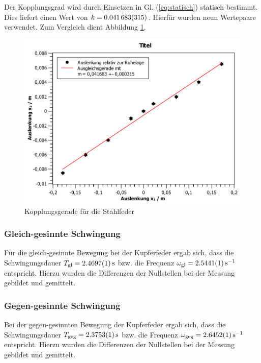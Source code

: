 \documentclass[11pt,a4paper,titlepage, ngerman]{article}
\newcommand{\refeq}[1]{Gl. (\ref{eq:#1})}
\begin{document}
				Der Kopplungsgrad wird durch Einsetzen in \refeq{statisch} statisch bestimmt. Dies liefert einen Wert von $k=\SI{0,041683 +- 0,000315}{}$. Hierfür wurden neun Wertepaare verwendet. Zum Vergleich dient Abbildung \ref{abb:FeKopp}.
				\begin{figure}[ht]
					\centering
					\includegraphics[width=\textwidth]{Kopplungsgerade-Fe.pdf}
					\caption{Kopplungsgerade für die Stahlfeder}
					\label{abb:FeKopp}	
				\end{figure}
			
			\subsubsection{Gleich-gesinnte Schwingung}
			
				Für die gleich-gesinnte Bewegung bei der Kupferfeder ergab sich, dass die Schwingungsdauer $T_\text{gl} = \SI{2,4697 +- 0,0001}{\second}$ bzw. die Frequenz $\omega_\text{gl}  = \SI{2,5441 +- 0,0001}{\s^{-1}}$ entspricht. Hierzu wurden die Differenzen der Nullstellen bei der Messung gebildet und gemittelt. 
			
			\subsubsection{Gegen-gesinnte Schwingung}
			
				Bei der gegen-gesinnten Bewegung der Kupferfeder ergab sich, dass die Schwingungsdauer $T_\text{geg} = \SI{2,3753 +- 0,0001}{\second}$ bzw. die Frequenz $\omega_\text{geg}  = \SI{2,6452 +- 0,0001}{\s^{-1}}$ entspricht. Hierzu wurden die Differenzen der Nullstellen bei der Messung gebildet und gemittelt. 
			
\end{document}
